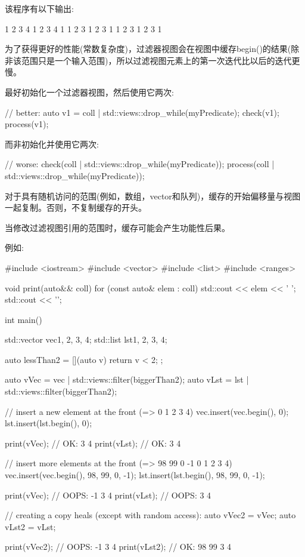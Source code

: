该程序有以下输出:

\begin{shell}
1 2 3 4 1 2 3 4 1
1 2 3 1 2 3 1
1 2 3 1 2 3 1
\end{shell}


为了获得更好的性能(常数复杂度)，过滤器视图会在视图中缓存begin()的结果(除非该范围只是一个输入范围)，所以过滤视图元素上的第一次迭代比以后的迭代更慢。

最好初始化一个过滤器视图，然后使用它两次:

\begin{cpp}
// better:
auto v1 = coll | std::views::drop_while(myPredicate);
check(v1);
process(v1);
\end{cpp}

而非初始化并使用它两次:

\begin{cpp}
// worse:
check(coll | std::views::drop_while(myPredicate));
process(coll | std::views::drop_while(myPredicate));
\end{cpp}

对于具有随机访问的范围(例如，数组，vector和队列)，缓存的开始偏移量与视图一起复制。否则，不复制缓存的开头。

当修改过滤视图引用的范围时，缓存可能会产生功能性后果。

例如:


\begin{cpp}
#include <iostream>
#include <vector>
#include <list>
#include <ranges>

void print(auto&& coll)
{
	for (const auto& elem : coll) {
		std::cout << elem << ' ';
	}
	std::cout << '\n';
}

int main()
{
	std::vector vec{1, 2, 3, 4};
	std::list lst{1, 2, 3, 4};
	
	auto lessThan2 = [](auto v){
		return v < 2;
	};
	
	auto vVec = vec | std::views::filter(biggerThan2);
	auto vLst = lst | std::views::filter(biggerThan2);
	
	// insert a new element at the front (=> 0 1 2 3 4)
	vec.insert(vec.begin(), 0);
	lst.insert(lst.begin(), 0);
	
	print(vVec); // OK: 3 4
	print(vLst); // OK: 3 4
	
	// insert more elements at the front (=> 98 99 0 -1 0 1 2 3 4)
	vec.insert(vec.begin(), {98, 99, 0, -1});
	lst.insert(lst.begin(), {98, 99, 0, -1});
	
	print(vVec); // OOPS: -1 3 4
	print(vLst); // OOPS: 3 4
	
	// creating a copy heals (except with random access):
	auto vVec2 = vVec;
	auto vLst2 = vLst;
	
	print(vVec2); // OOPS: -1 3 4
	print(vLst2); // OK: 98 99 3 4
}
\end{cpp}

